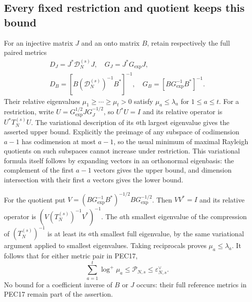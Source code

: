 \documentclass[11pt,a4paper]{article}
\begin{document}
\subsection{Every fixed restriction and quotient keeps this bound}
For an injective matrix $J$ and an onto matrix $B$, retain respectively
the full paired metrics
\[
\begin{gathered}
 D_J=J^*\mathcal D_N^{(s)}J,\quad G_J=J^*G_{\exp}J,\\
 D_B=[B(\mathcal D_N^{(s)})^{-1}B^*]^{-1},\quad
 G_B=[BG_{\exp}^{-1}B^*]^{-1}.
\end{gathered}\tag{PEC17}
\]
Their relative eigenvalues $\mu_1\ge\cdots\ge\mu_t>0$ satisfy
$\mu_a\le\lambda_a$ for $1\le a\le t$. For a restriction,
write $U=G_{\exp}^{1/2}J G_J^{-1/2}$, so $U^*U=I$ and its
relative operator is $U^*T_N^{(s)}U$. The variational description
of its $a$th largest eigenvalue gives the asserted upper bound.
Explicitly the preimage of any subspace of codimension $a-1$ has
codimension at most $a-1$, so the usual minimum of maximal Rayleigh
quotients on such subspaces cannot increase under restriction.
This variational formula itself follows by expanding vectors in an
orthonormal eigenbasis: the complement of the first $a-1$ vectors
gives the upper bound, and dimension intersection with their first
$a$ vectors gives the lower bound.

For the quotient put $V=(BG_{\exp}^{-1}B^*)^{-1/2}BG_{\exp}^{-1/2}$.
Then $VV^*=I$ and its relative operator is
$(V(T_N^{(s)})^{-1}V^*)^{-1}$. The $a$th smallest eigenvalue of
the compression of $(T_N^{(s)})^{-1}$ is at least its $a$th smallest
full eigenvalue, by the same variational argument applied to smallest
eigenvalues. Taking reciprocals proves $\mu_a\le\lambda_a$.
It follows that for either metric pair in PEC17,
\[
 \sum_{a=1}^t\log^+\mu_a\le\mathcal P_{N,s}
                         \le\varepsilon_{N,s}^{\vee}.
 \tag{PEC18}
\]
No bound for a coefficient inverse of $B$ or $J$ occurs: their full
reference metrics in PEC17 remain part of the assertion.
\end{document}
